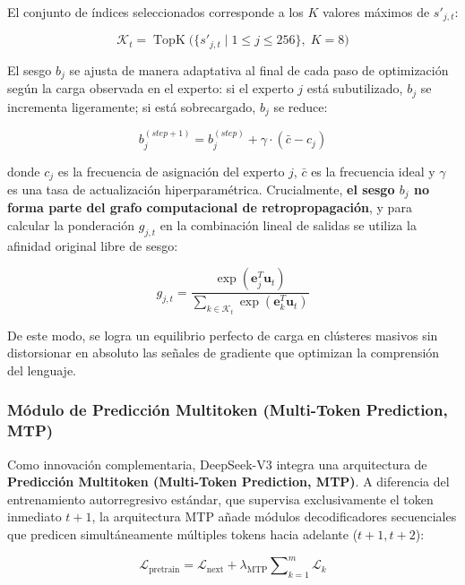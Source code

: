 El conjunto de índices seleccionados corresponde a los $K$ valores máximos de $s'_{j,t}$:

\begin{equation}
\mathcal{K}_t = \operatorname{TopK}\bigl( \{ s'_{j,t} \mid 1 \le j \le 256 \}, \; K=8 \bigr)
\end{equation}

El sesgo $b_j$ se ajusta de manera adaptativa al final de cada paso de optimización según la carga observada en el experto: si el experto $j$ está subutilizado, $b_j$ se incrementa ligeramente; si está sobrecargado, $b_j$ se reduce:

\begin{equation}
b_j^{(step+1)} = b_j^{(step)} + \gamma \cdot \left( \bar{c} - c_j \right)
\end{equation}

donde $c_j$ es la frecuencia de asignación del experto $j$, $\bar{c}$ es la frecuencia ideal y $\gamma$ es una tasa de actualización hiperparamétrica. Crucialmente, \textbf{el sesgo $b_j$ no forma parte del grafo computacional de retropropagación}, y para calcular la ponderación $g_{j,t}$ en la combinación lineal de salidas se utiliza la afinidad original libre de sesgo:

\begin{equation}
g_{j,t} = \frac{\exp(\mathbf{e}_j^T \mathbf{u}_t)}{\sum_{k \in \mathcal{K}_t} \exp(\mathbf{e}_k^T \mathbf{u}_t)}
\end{equation}

De este modo, se logra un equilibrio perfecto de carga en clústeres masivos sin distorsionar en absoluto las señales de gradiente que optimizan la comprensión del lenguaje.

\subsubsection{Módulo de Predicción Multitoken (Multi-Token Prediction, MTP)}

Como innovación complementaria, DeepSeek-V3 integra una arquitectura de \textbf{Predicción Multitoken (Multi-Token Prediction, MTP)}. A diferencia del entrenamiento autorregresivo estándar, que supervisa exclusivamente el token inmediato $t+1$, la arquitectura MTP añade módulos decodificadores secuenciales que predicen simultáneamente múltiples tokens hacia adelante ($t+1, t+2$):

\begin{equation}
\mathcal{L}_{\mathrm{pretrain}} = \mathcal{L}_{\mathrm{next}} + \lambda_{\mathrm{MTP}} \sum\nolimits_{k=1}^m \mathcal{L}_k
\end{equation}

